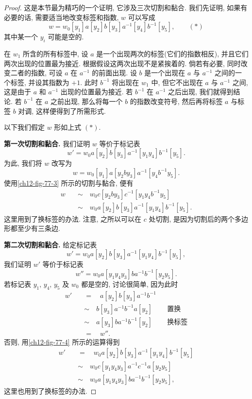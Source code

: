 \begin{proof}
这是本节最为精巧的一个证明, 它涉及三次切割和黏合. 我们先证明, 如果有必要的话, 需要适当地改变标签和指数, $w$ 可以写成
\[
w=w_{0}[y_{1}]a[y_{2}]b[y_{3}]a^{-1}[y_{4}]b^{-1}[y_{5}], \qquad (*)
\]
其中某一个 $y_{i}$ 可能是空的.

在 $w_{1}$ 所含的所有标签中, 设 $a$ 是一个出现两次的标签(它们的指数相反), 并且它们两次出现的位置最为接近. 根据假设这两次出现不是紧挨着的. 倘若有必要, 同时改变二者的指数, 可设 $a$ 在 $a^{-1}$ 的前面出现. 设 $b$ 是一个出现在 $a$ 与 $a^{-1}$ 之间的一个标签, 并设其指数为 $+1$. 此时 $b^{-1}$ 将出现在 $w_{1}$ 中, 但它不出现在 $a$ 与 $a^{-1}$ 之间, 这是由于 $a$ 和 $a^{-1}$ 出现的位置最为接近. 若 $b^{-1}$ 在 $a^{-1}$ 之后出现, 我们就得到结论. 若 $b^{-1}$ 在 $a$ 之前出现, 那么将每一个 $b$ 的指数改变符号, 然后再将标签 $a$ 与标签 $b$ 对调, 这样便得到了所需形式.

以下我们假定 $w$ 形如上式 $(*)$.

\textbf{第一次切割和黏合.} 我们证明 $w$ 等价于标记表
\[
w'=w_{0}a[y_{2}]b[y_{3}]a^{-1}[y_{1}y_{4}]b^{-1}[y_{5}].
\]
为此, 我们将 $w$ 改写为
\[
w=w_{0}[y_{1}]a[y_{2}by_{3}]a^{-1}[y_{4}b^{-1}y_{5}].
\]
使用\cref{ch12-fig-77-3} 所示的切割与黏合, 便有
\begin{align*}
w\quad&\sim\quad w_{0}c[y_{2}by_{3}]c^{-1}[y_{1}y_{4}b^{-1}y_{5}]\\
&\sim\quad w_{0}a[y_{2}]b[y_{3}]a^{-1}[y_{1}y_{4}]b^{-1}[y_{5}].
\end{align*}
这里用到了换标签的办法. 注意, 之所以可以在 $c$ 处切割, 是因为切割后的两个多边形都至少有三条边.


\textbf{第二次切割和黏合.} 给定标记表
\[
w'=w_{0}a[y_{2}]b[y_{3}]a^{-1}[y_{1}y_{4}]b^{-1}[y_{5}],
\]
我们证明 $w'$ 等价于标记表
\[
w''=w_{0}a[y_{1}y_{4}y_{3}]ba^{-1}b^{-1}[y_{2}y_{5}].
\]
若标记表 $y_{1}$, $y_{4}$, $y_{5}$ 及 $w_{0}$ 都是空的, 讨论很简单, 因为此时
\begin{align*}
w'\quad&=\quad a[y_{2}]b[y_{3}]a^{-1}b^{-1}\\
&\sim\quad b[y_{3}]a^{-1}b^{-1}a[y_{2}] &&\text{置换}\\
&\sim\quad a[y_{3}]ba^{-1}b^{-1}[y_{2}] &&\text{换标签}\\
&=\quad w''.
\end{align*}
否则, 用\cref{ch12-fig-77-4} 所示的运算得到
\begin{align*}
w'\quad&=\quad w_{0}a[y_{2}]b[y_{3}]a^{-1}[y_{1}y_{4}]b^{-1}[y_{5}]\\
&\sim\quad w_{0}c[y_{1}y_{4}y_{3}]a^{-1}c^{-1}a[y_{2}y_{5}]\\
&\sim\quad w_{0}a[y_{1}y_{4}y_{3}]ba^{-1}b^{-1}[y_{2}y_{5}],
\end{align*}
这里也用到了换标签的办法.



\end{proof}
